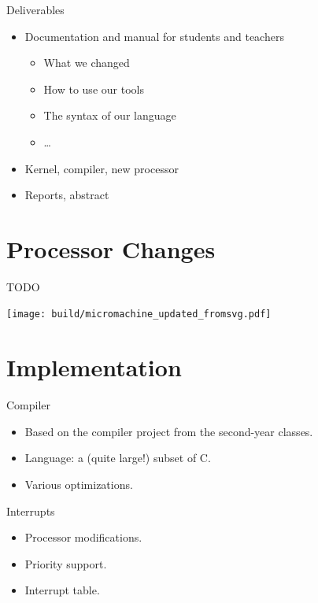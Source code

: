 \documentclass{beamer}
\begin{document}
      \begin{frame}{Deliverables}
        \begin{itemize}
          \item Documentation and manual for students and teachers
            \begin{itemize}
              \item What we changed
              \item How to use our tools
              \item The syntax of our language
              \item \dots
            \end{itemize}
          \item Kernel, compiler, new processor
          \item Reports, abstract
        \end{itemize}
      \end{frame}

  \section{Processor Changes}
    \begin{frame}
TODO
    \end{frame}
    \begin{landscape}
        \begin{frame}[plain]
            \texttt{[image: build/micromachine\_updated\_fromsvg.pdf]}

        \end{frame}
    \end{landscape}

  \section{Implementation}
    \begin{frame}{Compiler}
      \begin{itemize}
        \item Based on the compiler project from the second-year classes.
        \item Language: a (quite large!) subset of C.
        \item Various optimizations.
      \end{itemize}
    \end{frame}

    \begin{frame}{Interrupts}
      \begin{itemize}
        \item Processor modifications.
        \item Priority support.
        \item Interrupt table.
      \end{itemize}
    \end{frame}
\end{document}
